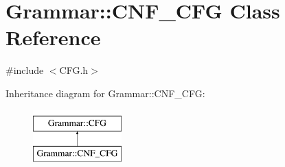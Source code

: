 \hypertarget{classGrammar_1_1CNF__CFG}{\section{\-Grammar\-:\-:\-C\-N\-F\-\_\-\-C\-F\-G \-Class \-Reference}
\label{dc/d05/classGrammar_1_1CNF__CFG}
}


{\ttfamily \#include $<$\-C\-F\-G.\-h$>$}

\-Inheritance diagram for \-Grammar\-:\-:\-C\-N\-F\-\_\-\-C\-F\-G\-:\begin{figure}[H]
\begin{center}
\leavevmode
\includegraphics[height=2.000000cm]{dc/d05/classGrammar_1_1CNF__CFG}
\end{center}
\end{figure}
